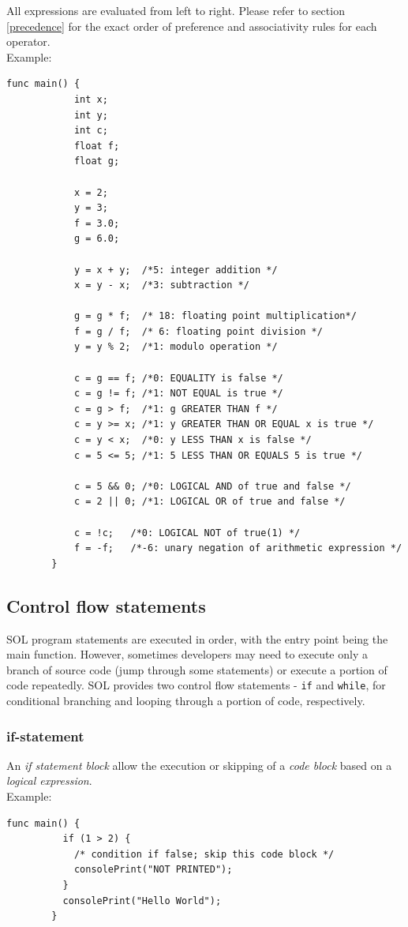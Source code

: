 \documentclass[letterpaper,12pt]{report}
\begin{document}
    All expressions are evaluated from left to right. Please refer to section \ref{precedence} for the exact order of preference and associativity rules for each operator.\\

    Example:\\
    \begin{lstlisting}[style=sol]
        func main() {
            int x;
            int y;
            int c;
            float f;
            float g;

            x = 2;
            y = 3;
            f = 3.0;
            g = 6.0;

            y = x + y;  /*5: integer addition */
            x = y - x;  /*3: subtraction */

            g = g * f;  /* 18: floating point multiplication*/
            f = g / f;  /* 6: floating point division */
            y = y % 2;  /*1: modulo operation */

            c = g == f; /*0: EQUALITY is false */
            c = g != f; /*1: NOT EQUAL is true */
            c = g > f;  /*1: g GREATER THAN f */
            c = y >= x; /*1: y GREATER THAN OR EQUAL x is true */
            c = y < x;  /*0: y LESS THAN x is false */
            c = 5 <= 5; /*1: 5 LESS THAN OR EQUALS 5 is true */

            c = 5 && 0; /*0: LOGICAL AND of true and false */
            c = 2 || 0; /*1: LOGICAL OR of true and false */

            c = !c;   /*0: LOGICAL NOT of true(1) */
            f = -f;   /*-6: unary negation of arithmetic expression */
        }
    \end{lstlisting} 

    \subsection{Control flow statements}
    SOL program statements are executed in order, with the entry point being the main function. However, sometimes developers may need to execute only a branch of source code (jump through some statements) or execute a portion of code repeatedly. SOL provides two control flow statements - \texttt{if} and \texttt{while}, for conditional branching and looping through a portion of code, respectively.

      \subsubsection{if-statement}
      An \textit{if statement block} allow the execution or skipping of a \textit{code block} based on a \textit{logical expression}.\\
      Example:\\
      \begin{lstlisting}[style=sol]
        func main() {
          if (1 > 2) {
            /* condition if false; skip this code block */
            consolePrint("NOT PRINTED");
          }
          consolePrint("Hello World");
        }
      \end{lstlisting}
\end{document}
